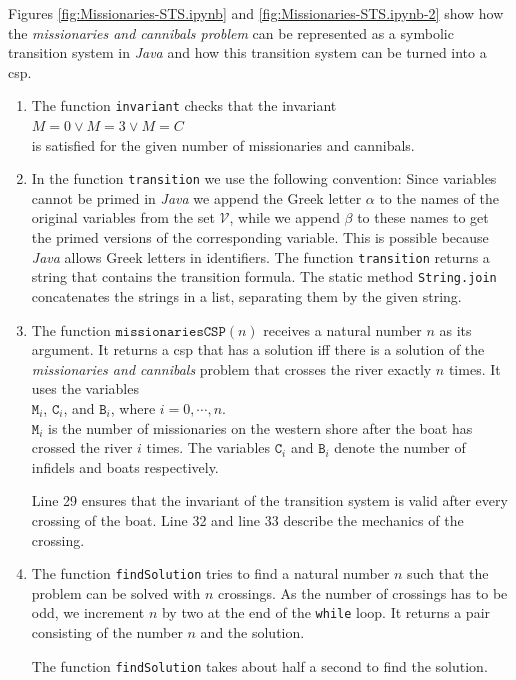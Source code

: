 Figures \ref{fig:Missionaries-STS.ipynb} and \ref{fig:Missionaries-STS.ipynb-2} show how the \emph{missionaries
and cannibals problem} can be represented as a symbolic transition system in \textsl{Java} and how this
transition system can be turned into a \Gls{csp}.
\begin{enumerate}
\item The function \texttt{invariant} checks that the invariant
      \\[0.2cm]
      \hspace*{1.3cm}
      $M = 0 \vee M = 3 \vee M = C$
      \\[0.2cm]
      is satisfied for the given number of missionaries and cannibals.
\item In the function \texttt{transition} 
      we use the following convention: Since variables cannot be primed in
      \textsl{Java} we append the Greek letter $\alpha$ to the names of the original
      variables from the set $\mathcal{V}$, while we append $\beta$ to these names to get the primed versions of the
      corresponding variable.  This is possible because \textsl{Java} allows Greek letters in identifiers.
      The function \texttt{transition} returns a string that contains the transition formula.  The static method
      \texttt{String.join} concatenates the strings in a list, separating them by the given string.
\item The function $\mathtt{missionariesCSP}(n)$ receives a natural number $n$ as its argument.
       It returns a \Gls{csp} that has a solution iff there is a solution of the \emph{missionaries and cannibals}
       problem that crosses the river exactly $n$ times.  It uses the variables
       \\[0.2cm]
       \hspace*{1.3cm}
       $\mathtt{M}_i$, $\mathtt{C}_i$, and $\mathtt{B}_i$, where $i=0,\cdots,n$.
       \\[0.2cm]
       $\mathtt{M}_i$ is the number of missionaries on the western shore after the boat has crossed the river
       $i$ times. The variables $\mathtt{C}_i$ and $\texttt{B}_i$ denote the number of infidels and boats
       respectively.

       Line 29 ensures that the invariant of the transition system is valid after every crossing of the boat.
       Line 32 and line 33 describe the mechanics of the crossing.
\item The function \texttt{findSolution} tries to find a natural number $n$ such that the problem can be solved
       with $n$ crossings. As the number of crossings has to be odd, we increment $n$ by
       two at the end of the \texttt{while} loop.  It returns a pair consisting of the number $n$ and the
       solution.

       The function \texttt{findSolution} takes about half a second to find the solution.
\end{enumerate}

